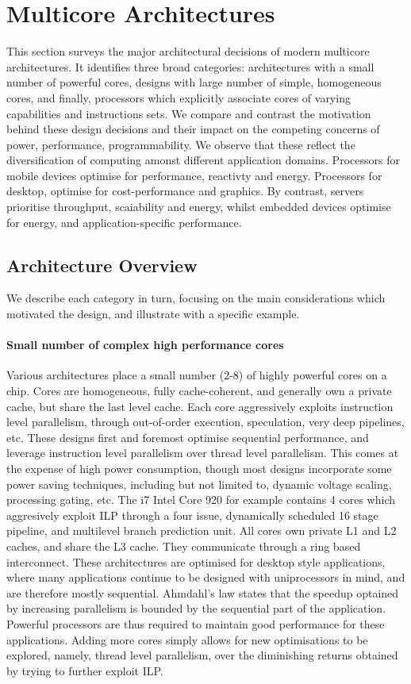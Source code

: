 
\section{Multicore Architectures}
This section surveys the major architectural decisions of modern multicore 
architectures. It identifies three broad categories:
architectures with a small number of powerful cores, designs with large number of simple, homogeneous cores, and
finally, processors which explicitly associate
cores of varying capabilities and instructions sets.
We compare and contrast the motivation behind these
design decisions and their impact on the competing
concerns of power, performance, programmability.
We observe that these reflect the diversification of computing
amonst different application domains. Processors for mobile devices
optimise for performance, reactivty and energy. Processors for desktop, 
optimise for cost-performance and  graphics. By contrast,
servers prioritise throughput, scaiability and energy, whilst
embedded devices optimise for energy, and application-specific
performance. 

\subsection{Architecture Overview}

We describe each category in turn, focusing on the main 
considerations which motivated the design, and illustrate
with a specific example.

\paragraph{Small number of complex high performance cores}
Various architectures place a small number (2-8) of highly
powerful cores on a chip.  Cores are homogeneous, fully cache-coherent,
and generally own a private cache, but share the last level cache. 
Each core aggressively exploits instruction level parallelism, through
out-of-order execution, speculation, very deep pipelines, etc. 
These designs first and foremost optimise sequential performance, 
and leverage instruction level parallelism over thread level parallelism. 
This comes at the expense of high power consumption, 
though most designs incorporate some power
saving techniques, including but not limited to, dynamic 
voltage scaling, processing gating, etc.
The i7 Intel Core 920 for example contains 4 cores which aggresively
exploit ILP through a four issue,  dynamically scheduled 16 stage pipeline,
and multilevel branch prediction unit. All cores own
 private L1 and L2 caches, and share the L3 cache. They communicate
through a ring based interconnect. These architectures are
optimised for desktop style applications, where many applications continue
to be designed with uniprocessors in mind, and are therefore mostly sequential.
Ahmdahl's law states that the speedup optained by increasing parallelism 
is bounded by the sequential part of the application. Powerful processors are 
thus required to maintain good performance for these applications. 
Adding more cores simply allows for new optimisations to be explored, namely, 
thread level parallelism, over the diminishing returns obtained by trying
to further exploit ILP. 


